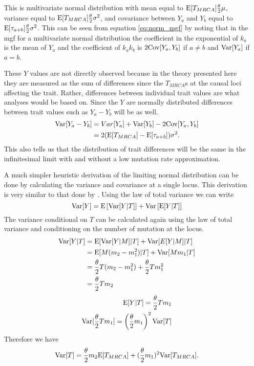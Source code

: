 This is multivariate normal distribution with mean equal to $\mathrm{E}[T_{MRCA}] \frac{\theta}{2} \mu$,
variance equal to $\mathrm{E}[T_{MRCA}] \frac{\theta}{2} \sigma^2$, and covariance between $Y_a$ and $Y_b$
equal to $\mathrm{E}[\tau_{a+b}] \frac{\theta}{2} \sigma^2$. This can be seen from equation
\eqref{eq:norm_mgf} by noting that in the mgf for a multivariate normal
distribution the coefficient in the exponential of $k_a$ is the mean of $Y_a$
and the coefficient of $k_ak_b$ is $2\mathrm{Cov}[Y_a,Y_b]$ if $a\neq b$ and $\mathrm{Var}[Y_a]$
if $a=b$.

These $Y$ values are not directly observed because in the theory presented here
they are measured as the sum of differences since the $T_{MRCA}$s at the causal
loci affecting the trait. Rather, differences between individual trait values
are what analyses would be based on. Since the $Y$ are normally distributed
differences between trait values such as $Y_a-Y_b$ will be as well.
\begin{align*}
  \mathrm{Var}[Y_a-Y_b] &= Var[Y_a] + \mathrm{Var}[Y_b] - 2\mathrm{Cov}[Y_a,Y_b]\\
                &= 2(\mathrm{E}[T_{MRCA}] - \mathrm{E}[\tau_{a+b}])\sigma^2.
\end{align*}
This also tells us that the distribution of trait differences will be the same
in the infinitesimal limit with and without a low mutation rate approximation.

A much simpler heuristic derivation of the limiting normal distribution can be
done by calculating the variance and covariance at a single locus. This
derivation is very similar to that done by \citet{Schraiber2015}. Using the law
of total variance we can write
\begin{equation*}
  \mathrm{Var}[Y] = \mathrm{E}\left[\mathrm{Var}[Y|T]\right] +
  \mathrm{Var}\left[\mathrm{E}[Y|T]\right]
\end{equation*}
The variance conditional on $T$ can be calculated again using the law of total
variance and conditioning on the number of mutation at the locus. 
\begin{align*}
  \mathrm{Var}[Y|T] &= \mathrm{E}[\mathrm{Var}[Y|M]|T] + \mathrm{Var}[E[Y|M]|T]\\
            &= \mathrm{E}[M(m_2-m_1^2)|T] + \mathrm{Var}[Mm_1|T]\\
            &= \frac{\theta}{2} T (m_2-m_1^2) + \frac{\theta}{2} T m_1^2\\
            &= \frac{\theta}{2} T m_2
\end{align*}
\begin{align*}
  \mathrm{E}[Y|T] = \frac{\theta}{2} T m_1\\
  \mathrm{Var}[\frac{\theta}{2} T m_1] = \left( \frac{\theta}{2} m_1\right)^2\mathrm{Var}[T]
\end{align*}
Therefore we have
\begin{equation}
  \mathrm{Var}[T] = \frac{\theta}{2} m_2 \mathrm{E}[T_{MRCA}] + (\frac{\theta}{2} m_1)^2 \mathrm{Var}[T_{MRCA}].
\end{equation}

